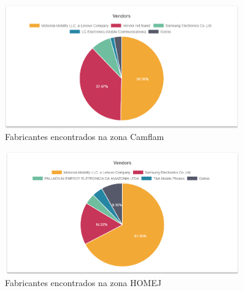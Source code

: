 \begin{figure}[!h]
  \caption{\label{graf1}Fabricantes encontrados na zona Camflam}
  \begin{center}
    \includegraphics[width=0.90\textwidth]{img/setor-camflam.png}
  \end{center}
\end{figure}

\begin{figure}[!h]
  \caption{\label{graf2}Fabricantes encontrados na zona HOMEJ}
  \begin{center}
    \includegraphics[width=0.90\textwidth]{img/setor.png}
  \end{center}
\end{figure}

